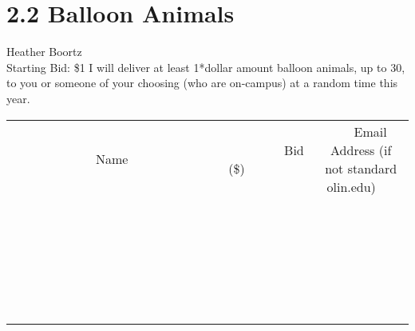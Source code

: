 \documentclass[11pt]{article}
\begin{document}
\section*{2.2 Balloon Animals}
Heather Boortz
\\
Starting Bid: \$1
\newline
I will deliver at least 1*dollar amount balloon animals, up to 30, to you or someone of your choosing (who are on-campus) at a random time this year.
\\[6ex]
\begin{tabular}{c c c}
~~~~~~~~~~~~~Name~~~~~~~~~~~~~ & ~~~~~~~~~Bid (\$)~~~~~~~~~  & ~~~Email Address (if not standard olin.edu)~~~\\
 & & \\
\hline
 & & \\
\hline
 & & \\
\hline
 & & \\
\hline
 & & \\
\hline
 & & \\
\hline
 & & \\
\hline
 & & \\
\hline
 & & \\
\hline
 & & \\
\hline
 & & \\
\hline
 & & \\
\hline
 & & \\
\hline
 & & \\
\hline
 & & \\
\hline
 & & \\
\hline
 & & \\
\hline
 & & \\
\hline
 & & \\
\hline
 & & \\
\hline
 & & \\
\hline
 & & \\
\hline
 & & \\
\hline
 & & \\
\hline
 & & \\
\hline
 & & \\
\hline
\end{tabular}
\newpage
\end{document}
